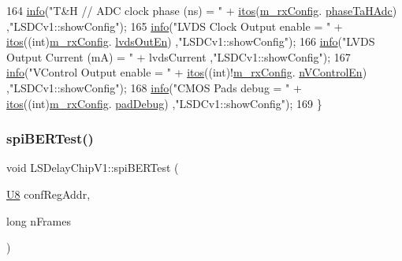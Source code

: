 \begin{DoxyCode}
164     \hyperlink{classObject_a644fd329ea4cb85f54fa6846484b84a8}{info}(\textcolor{stringliteral}{"T&H // ADC clock phase (ns) = "} + \hyperlink{Tools_8h_af330027dbdafb9a30768b3613c553e60}{itos}(\hyperlink{classLSDelayChipV1_a4818ac5c0d7ccf2845a01226234bdb67}{m\_rxConfig}.
      \hyperlink{structconfRegData_a2e471f30b32e57270cb2edb0e420cf1b}{phaseTaHAdc})       ,\textcolor{stringliteral}{"LSDCv1::showConfig"});   
165     \hyperlink{classObject_a644fd329ea4cb85f54fa6846484b84a8}{info}(\textcolor{stringliteral}{"LVDS Clock Output enable    = "} + \hyperlink{Tools_8h_af330027dbdafb9a30768b3613c553e60}{itos}((\textcolor{keywordtype}{int})\hyperlink{classLSDelayChipV1_a4818ac5c0d7ccf2845a01226234bdb67}{m\_rxConfig}.
      \hyperlink{structconfRegData_a709d8d691ef0c8ea5c4c03aac3d851f1}{lvdsOutEn})    ,\textcolor{stringliteral}{"LSDCv1::showConfig"});
166     \hyperlink{classObject_a644fd329ea4cb85f54fa6846484b84a8}{info}(\textcolor{stringliteral}{"LVDS Output Current (mA)    = "} + lvdsCurrent                        ,\textcolor{stringliteral}{"LSDCv1::showConfig"});
167     \hyperlink{classObject_a644fd329ea4cb85f54fa6846484b84a8}{info}(\textcolor{stringliteral}{"VControl Output enable      = "} + \hyperlink{Tools_8h_af330027dbdafb9a30768b3613c553e60}{itos}((\textcolor{keywordtype}{int})!\hyperlink{classLSDelayChipV1_a4818ac5c0d7ccf2845a01226234bdb67}{m\_rxConfig}.
      \hyperlink{structconfRegData_a62f72429bde3ede255f6d8dfe1401c37}{nVControlEn}) ,\textcolor{stringliteral}{"LSDCv1::showConfig"});
168     \hyperlink{classObject_a644fd329ea4cb85f54fa6846484b84a8}{info}(\textcolor{stringliteral}{"CMOS Pads debug             = "} + \hyperlink{Tools_8h_af330027dbdafb9a30768b3613c553e60}{itos}((\textcolor{keywordtype}{int})\hyperlink{classLSDelayChipV1_a4818ac5c0d7ccf2845a01226234bdb67}{m\_rxConfig}.
      \hyperlink{structconfRegData_a4e98d082c44e34995224bd242da493d0}{padDebug})     ,\textcolor{stringliteral}{"LSDCv1::showConfig"});
169 \}
\end{DoxyCode}
\mbox{\label{classLSDelayChipV1_ad0ed8d0797c985d7595fbe56f0da1996}} 
\subsubsection{\texorpdfstring{spi\+B\+E\+R\+Test()}{spiBERTest()}}
{\footnotesize\ttfamily void L\+S\+Delay\+Chip\+V1\+::spi\+B\+E\+R\+Test (\begin{DoxyParamCaption}\item[{\hyperlink{ICECALv3_8h_a3cb25ca6f51f003950f9625ff05536fc}{U8}}]{conf\+Reg\+Addr,  }\item[{long}]{n\+Frames }\end{DoxyParamCaption})}



